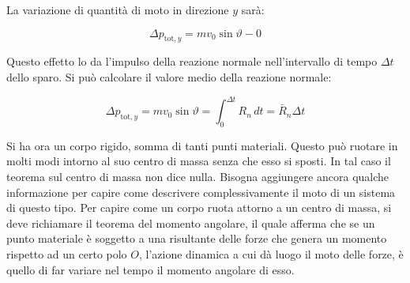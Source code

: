 La variazione di quantità di moto in direzione $y$ sarà:

\[
	\Delta p_{\text{tot},y}=mv_0\sin\vartheta-0
\]

Questo effetto lo da l'impulso della reazione normale nell'intervallo di tempo $\Delta t$ dello sparo. Si può calcolare il valore medio della reazione normale:

\[
	\Delta p_{\text{tot},y}=mv_0\sin\vartheta=\int_0^{\Delta t} R_n \,dt=\bar{R}_n\Delta t
\]

Si ha ora un corpo rigido, somma di tanti punti materiali. Questo può ruotare in molti modi intorno al suo centro di massa senza che esso si sposti. In tal caso il teorema sul centro di massa non dice nulla. Bisogna aggiungere ancora qualche informazione per capire come descrivere complessivamente il moto di un sistema di questo tipo.
Per capire come un corpo ruota attorno a un centro di massa, si deve richiamare il teorema del momento angolare, il quale afferma che se un punto materiale è soggetto a una risultante delle forze che genera un momento rispetto ad un certo polo $O$, l'azione dinamica a cui dà luogo il moto delle forze, è quello di far variare nel tempo il momento angolare di esso.

